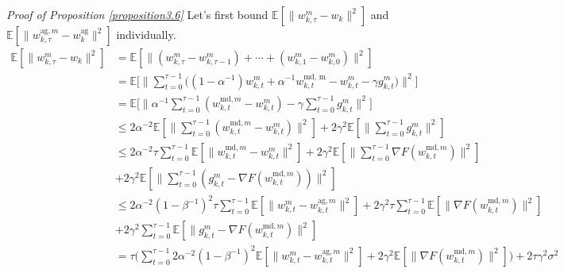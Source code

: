 \documentclass[11pt]{article}
\begin{document}
\emph{Proof of Proposition \ref{proposition3.6}} \textrm{ } Let's first bound $\mathbb{E}[\|w_{k, \tau}^m - w_k\|^2]$ and $\mathbb{E}[\|w_{k, \tau}^{\textrm{ag}, m} - w_k^{\textrm{ag}}\|^2]$ individually.
\begin{align*}
    \mathbb{E}[\|w_{k, \tau}^m - w_k\|^2] &= \mathbb{E}[\|(w_{k, \tau}^m-w_{k, \tau-1}^m) +\cdots+ (w_{k, 1}^m - w_{k, 0}^m)\|^2] \\
    &= \mathbb{E}\Big[\Big\|\sum_{t=0}^{\tau-1}\Big((1-\alpha^{-1})w_{k, t}^m+\alpha^{-1}w_{k, t}^{\textrm{md, m}}-w_{k, t}^m-\gamma g_{k, t}^m\Big)\Big\|^2\Big] \\
    &= \mathbb{E}\Big[\Big\|\alpha^{-1}\sum_{t=0}^{\tau-1}(w_{k, t}^{\textrm{md}, m}-w_{k, t}^m) - \gamma\sum_{t=0}^{\tau-1}g_{k, t}^m\Big\|^2\Big] \\
    &\leq 2\alpha^{-2}\mathbb{E}[\|\sum_{t=0}^{\tau-1}(w_{k, t}^{\textrm{md}, m}-w_{k, t}^m)\|^2] + 2\gamma^2\mathbb{E}[\|\sum_{t=0}^{\tau-1}g_{k, t}^m\|^2]\\
    &\leq 2\alpha^{-2}\tau\sum_{t=0}^{\tau-1}\mathbb{E}[\|w_{k, t}^{\textrm{md}, m}-w_{k, t}^m\|^2] + 2\gamma^2\mathbb{E}[\|\sum_{t=0}^{\tau-1}\nabla F(w_{k, t}^{\textrm{md}, m})\|^2] \\
    &+ 2\gamma^2\mathbb{E}[\|\sum_{t=0}^{\tau-1}(g_{k, t}^m - \nabla F(w_{k, t}^{\textrm{md}, m}))\|^2]\\
    &\leq 2\alpha^{-2}(1-\beta^{-1})^2\tau\sum_{t=0}^{\tau-1}\mathbb{E}[\|w_{k, t}^m-w_{k, t}^{\textrm{ag}, m}\|^2] + 2\gamma^2\tau\sum_{t=0}^{\tau-1}\mathbb{E}[\|\nabla F(w_{k, t}^{\textrm{md}, m})\|^2]\\
    &+ 2\gamma^2\sum_{t=0}^{\tau-1}\mathbb{E}[\|g_{k, t}^m - \nabla F(w_{k, t}^{\textrm{md}, m})\|^2]\\
    &= \tau \Big(\sum_{t=0}^{\tau-1} 2\alpha^{-2}(1-\beta^{-1})^2\mathbb{E}[\|w_{k, t}^m- w_{k, t}^{\textrm{ag}, m}\|^2 ] + 2\gamma^2\mathbb{E}[\|\nabla F(w_{k, t}^{\textrm{md}, m})\|^2]\Big) +2\tau\gamma^2\sigma^2
\end{align*}
\end{document}
